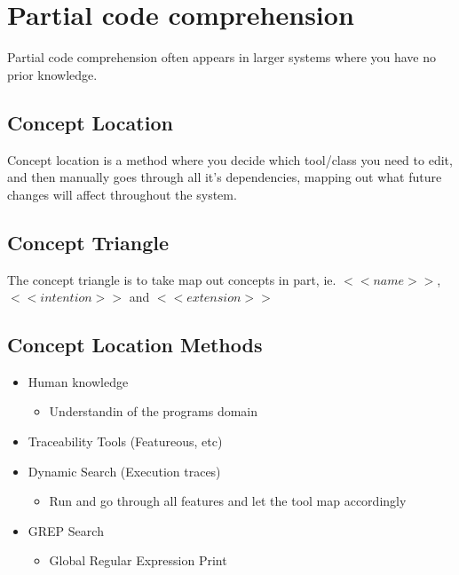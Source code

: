 \section{Partial code comprehension}
\begin{flushleft}
Partial code comprehension often appears in larger systems where you have no prior knowledge.
\end{flushleft}

\subsection{Concept Location}
\begin{flushleft}
Concept location is a method where you decide which tool/class you need to edit, and then manually goes through all it's dependencies, mapping out what future changes will affect throughout the system.
\end{flushleft}

\subsection{Concept Triangle}
\begin{flushleft}
	The concept triangle is to take map out concepts in part, ie. \textbf{$<<name>>$}, \textbf{$<<intention>>$} and \textbf{$<<extension>>$}
\end{flushleft}

\subsection{Concept Location Methods}
\begin{itemize}
	\item Human knowledge
		\begin{itemize}
			\item Understandin of the programs domain
		\end{itemize}
	\item Traceability Tools (Featureous, etc)
	\item Dynamic Search (Execution traces)
		\begin{itemize}
			\item Run and go through all features and let the tool map accordingly
		\end{itemize}
	\item GREP Search
		\begin{itemize}
			\item Global Regular Expression Print
		\end{itemize}
\end{itemize}
